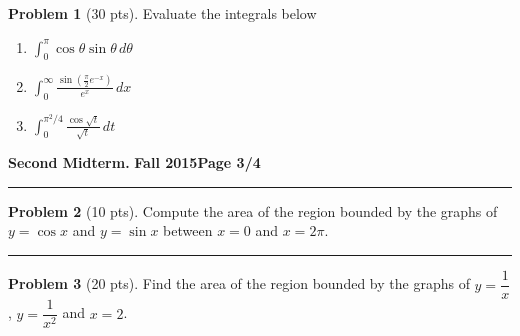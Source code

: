 \documentclass[12pt]{article}
\theoremstyle{definition}
\newtheorem{problem}{Problem}
\begin{document}
\bigskip
\begin{problem}[30 pts]
Evaluate the integrals below

\begin{enumerate}
\item $\displaystyle{\int_0^{\pi} \cos \theta  \sin \theta\, d\theta}$
\vspace{1.5cm}
\begin{flushright}
\end{flushright}

\item $\displaystyle{\int_0^{\infty} \frac{ \sin ( \tfrac{\pi}{2} e^{-x}) }{e^x} \, dx}$
\vspace{2.5cm}
\begin{flushright}
\end{flushright}
\item $\displaystyle{\int_0^{\pi^2/4} \frac{\cos \sqrt{t}}{\sqrt{t}}\, dt}$
\vspace{5cm}
\begin{flushright}
\end{flushright}
\end{enumerate}
\end{problem}
\newpage

\hfill{\large\bf Second Midterm.}\hfill{\large\bf
  Fall 2015}\hfill{\large\bf Page 3/4}\hrule

\bigskip
\begin{problem}[10 pts]
Compute the area of the region bounded by the graphs of $y=\cos x$ and $y=\sin x$ between $x=0$ and $x=2\pi$.
\vspace{8.5cm}
\begin{flushright}
\end{flushright}
\end{problem}
\hrule
\begin{problem}[20 pts]
Find the area of the region bounded by the graphs of $y=\dfrac{1}{x}$, $y=\dfrac{1}{x^2}$ and $x=2$.
\vspace{8.5cm}
\begin{flushright}
\end{flushright}
\end{problem}
\newpage
\end{document}
